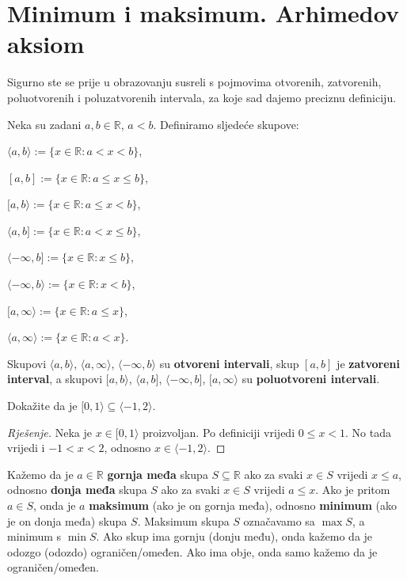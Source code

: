 \section{Minimum i maksimum. Arhimedov aksiom}
Sigurno ste se prije u obrazovanju susreli s pojmovima otvorenih, zatvorenih, poluotvorenih i poluzatvorenih intervala, za koje sad dajemo preciznu definiciju.
\begin{definition}
Neka su zadani $a, b\in \mathbb{R}$, $a<b$. Definiramo sljedeće skupove:
\begin{AutoMultiColItemize}
\item $\langle a, b\rangle:=\{x\in \mathbb{R} : a<x<b\}$,
\item $[a, b]:=\{x\in \mathbb{R} : a\leq x\leq b\}$,
\item $[a, b\rangle:=\{x\in \mathbb{R} : a\leq x< b\}$,
\item $\langle a, b]:=\{x\in \mathbb{R} : a< x\leq b\}$,
\item $\langle -\infty, b]:=\{x\in \mathbb{R} : x\leq b\}$,
\item $\langle -\infty, b\rangle:=\{x\in \mathbb{R} : x< b\}$,
\item $[a, \infty\rangle:=\{x\in \mathbb{R} : a\leq x\}$,
\item $\langle a, \infty\rangle:=\{x\in \mathbb{R} : a< x\}$.
\end{AutoMultiColItemize}
Skupovi $\langle a,b \rangle$, $\langle a,\infty \rangle$, $\langle -\infty,b \rangle$ su \textbf{otvoreni intervali}, skup $[a, b]$ je \textbf{zatvoreni interval}, a skupovi $[a, b\rangle$, $\langle a, b]$, $\langle -\infty, b]$, $[a, \infty\rangle$ su \textbf{poluotvoreni intervali}.
\end{definition}
\begin{exercise}
Dokažite da je $[0, 1\rangle \subseteq \langle -1, 2\rangle$.
\end{exercise}
\begin{proof}[Rješenje]
Neka je $x\in [0, 1\rangle$ proizvoljan. Po definiciji vrijedi $0\leq x<1$. No tada vrijedi i $-1<x<2$, odnosno $x\in \langle -1, 2\rangle$.
\end{proof}
\begin{definition}
\label{minimax}
Kažemo da je $a\in \mathbb{R}$ \textbf{gornja međa} skupa $S\subseteq{\mathbb{R}}$ ako za svaki $x\in S$ vrijedi $x\leq a$, odnosno \textbf{donja međa} skupa $S$ ako za svaki $x\in S$ vrijedi $a\leq x$. Ako je pritom $a\in S$, onda je $a$ \textbf{maksimum} (ako je on gornja međa), odnosno \textbf{minimum} (ako je on donja međa) skupa $S$. Maksimum skupa $S$ označavamo sa $\max{S}$, a minimum s $\min{S}$. Ako skup ima gornju (donju među), onda kažemo da je odozgo (odozdo) ograničen/omeđen. Ako ima obje, onda samo kažemo da je ograničen/omeđen.
\end{definition}

